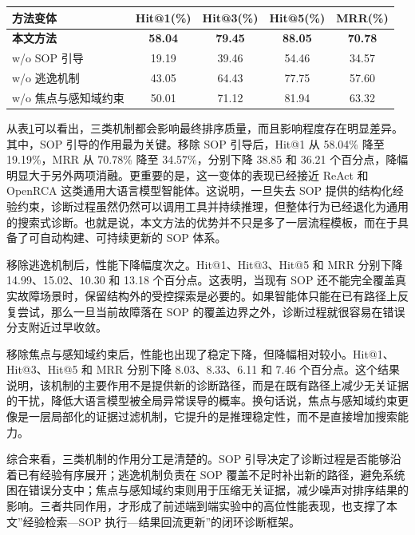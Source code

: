 \begin{table}[htbp]
    \centering
    \label{tab:ablation}
    \ChapFiveTableSetup
    \begin{tabular}{lcccc}
        \toprule
        \rowcolor{\ChapFiveTableHeadColor}
        \textbf{方法变体} & \textbf{Hit@1(\%)} & \textbf{Hit@3(\%)} & \textbf{Hit@5(\%)} & \textbf{MRR(\%)} \\
        \midrule
        \textbf{本文方法} & \textbf{58.04} & \textbf{79.45} & \textbf{88.05} & \textbf{70.78} \\
        w/o SOP 引导 & 19.19 & 39.46 & 54.46 & 34.57 \\
        w/o 逃逸机制 & 43.05 & 64.43 & 77.75 & 57.60 \\
        w/o 焦点与感知域约束 & 50.01 & 71.12 & 81.94 & 63.32 \\
        \bottomrule
    \end{tabular}
\end{table}

从表\ref{tab:ablation}可以看出，三类机制都会影响最终排序质量，而且影响程度存在明显差异。其中，SOP 引导的作用最为关键。移除 SOP 引导后，Hit@1 从 58.04\% 降至 19.19\%，MRR 从 70.78\% 降至 34.57\%，分别下降 38.85 和 36.21 个百分点，降幅明显大于另外两项消融。更重要的是，这一变体的表现已经接近 ReAct 和 OpenRCA 这类通用大语言模型智能体。这说明，一旦失去 SOP 提供的结构化经验约束，诊断过程虽然仍然可以调用工具并持续推理，但整体行为已经退化为通用的搜索式诊断。也就是说，本文方法的优势并不只是多了一层流程模板，而在于具备了可自动构建、可持续更新的 SOP 体系。

移除逃逸机制后，性能下降幅度次之。Hit@1、Hit@3、Hit@5 和 MRR 分别下降 14.99、15.02、10.30 和 13.18 个百分点。这表明，当现有 SOP 还不能完全覆盖真实故障场景时，保留结构外的受控探索是必要的。如果智能体只能在已有路径上反复尝试，那么一旦当前故障落在 SOP 的覆盖边界之外，诊断过程就很容易在错误分支附近过早收敛。

移除焦点与感知域约束后，性能也出现了稳定下降，但降幅相对较小。Hit@1、Hit@3、Hit@5 和 MRR 分别下降 8.03、8.33、6.11 和 7.46 个百分点。这个结果说明，该机制的主要作用不是提供新的诊断路径，而是在既有路径上减少无关证据的干扰，降低大语言模型被全局异常误导的概率。换句话说，焦点与感知域约束更像是一层局部化的证据过滤机制，它提升的是推理稳定性，而不是直接增加搜索能力。

综合来看，三类机制的作用分工是清楚的。SOP 引导决定了诊断过程是否能够沿着已有经验有序展开；逃逸机制负责在 SOP 覆盖不足时补出新的路径，避免系统困在错误分支中；焦点与感知域约束则用于压缩无关证据，减少噪声对排序结果的影响。三者共同作用，才形成了前述端到端实验中的高位性能表现，也支撑了本文”经验检索—SOP 执行—结果回流更新”的闭环诊断框架。

